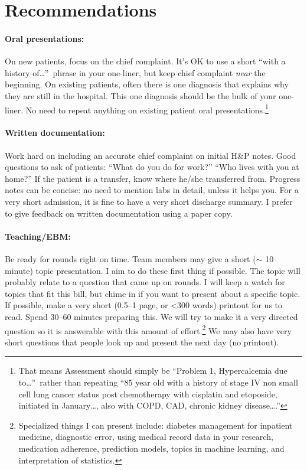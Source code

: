 \documentclass{tufte-handout}
\begin{document}
\section{Recommendations}

\paragraph{Oral presentations:} On new patients, focus on the chief
complaint. It's OK to use a short ``with a history
of\ldots{}''\ phrase in your one-liner, but keep chief complaint
\emph{near} the beginning. On existing patients, often there is one
diagnosis that explains why they are still in the hospital. This one
diagnosis should be the bulk of your one-liner. No need to repeat
anything on existing patient oral presentations.\footnote{That means
Assessment should simply be ``Problem 1, Hypercalcemia due
to\ldots{}''\ rather than repeating ``85 year old with a history of
stage IV non small cell lung cancer status post chemotherapy with
cisplatin and etoposide, initiated in January\ldots{}, also with COPD,
CAD, chronic kidney disease\ldots{}.''}

\paragraph{Written documentation:} Work hard on including an accurate chief
complaint on initial H\&P notes. Good questions to ask of patients:
``What do you do for work?'' ``Who lives with you at home?'' If the
patient is a transfer, know where he/she transferred from. Progress
notes can be concise: no need to mention labs in detail, unless it
helps you. For a very short admission, it is fine to have a very short
discharge summary. I prefer to give feedback on written documentation
using a paper copy.

\paragraph{Teaching/EBM:} Be ready for rounds right on time.
Team members may give a short ($\sim$ 10 minute) topic presentation. I
aim to do these first thing if possible. The topic will probably
relate to a question that came up on rounds. I will keep a watch for
topics that fit this bill, but chime in if you want to present about a
specific topic. If possible, make a very short (0.5--1 page, or <300
words) printout for us to read. Spend 30--60 minutes preparing this.
We will try to make it a very directed question so it is answerable
with this amount of effort.\footnote{Specialized things I can present
include: diabetes management for inpatient medicine, diagnostic error,
using medical record data in your research, medication adherence,
prediction models, topics in machine learning, and interpretation of
statistics.} We may also have very short questions that people look up
and present the next day (no printout).
\end{document}
